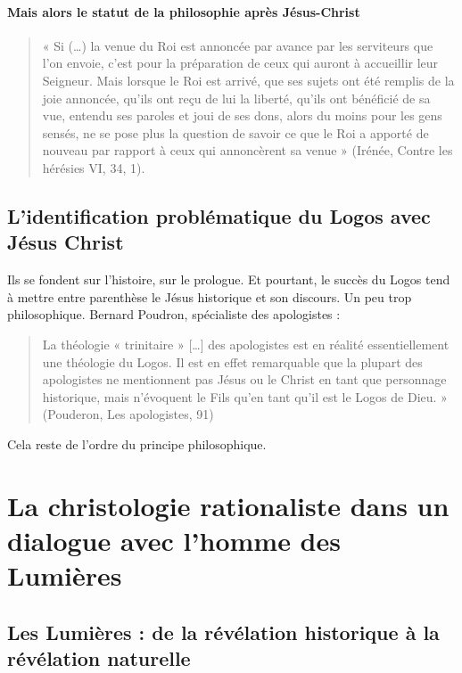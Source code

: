 \paragraph{Mais alors le statut de la philosophie après Jésus-Christ}
 \begin{quote}
    « Si (…) la venue du Roi est annoncée par avance par les serviteurs que l’on envoie, c’est
pour la préparation de ceux qui auront à accueillir leur Seigneur. Mais lorsque le Roi est
arrivé, que ses sujets ont été remplis de la joie annoncée, qu’ils ont reçu de lui la liberté, qu’ils
ont bénéficié de sa vue, entendu ses paroles et joui de ses dons, alors du moins pour les gens
sensés, ne se pose plus la question de savoir ce que le Roi a apporté de nouveau par rapport à
ceux qui annoncèrent sa venue » (Irénée, Contre les hérésies VI, 34, 1).
\end{quote}


 
\subsection{L’identification problématique du Logos avec Jésus Christ} Ils se fondent sur l'histoire, sur le prologue. Et pourtant, le succès du Logos tend à mettre entre parenthèse le Jésus historique et son discours. Un peu trop philosophique.
Bernard Poudron, spécialiste des apologistes : 
 \begin{quote}
    La théologie « trinitaire » […] des apologistes est en réalité essentiellement une théologie du
Logos. Il est en effet remarquable que la plupart des apologistes ne mentionnent pas Jésus ou
le Christ en tant que personnage historique, mais n’évoquent le Fils qu’en tant qu’il est le
Logos de Dieu. » (Pouderon, Les apologistes, 91)
\end{quote}
Cela reste de l'ordre du principe philosophique.



\section{ La christologie rationaliste dans un dialogue avec l’homme des Lumières}
 \subsection{Les Lumières : de la révélation historique à la révélation naturelle}
 
